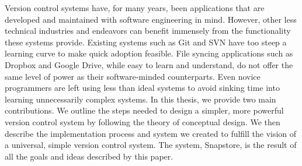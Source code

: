 % 
% 
%
Version control systems have, for many years, been applications that are developed and maintained with software engineering in mind. However, other less technical industries and endeavors can benefit immensely from the functionality these systems provide. Existing systems such as Git and SVN have too steep a learning curve to make quick adoption feasible. File syncing applications such as Dropbox and Google Drive, while easy to learn and understand, do not offer the same level of power as their software-minded counterparts. Even novice programmers are left using less than ideal systems to avoid sinking time into learning unnecessarily complex systems. In this thesis, we provide two main contributions. We outline the steps needed to design a simpler, more powerful version control system by following the theory of conceptual design. We then describe the implementation process and system we created to fulfill the vision of a universal, simple version control system. The system, Snapstore, is the result of all the goals and ideas described by this paper.
